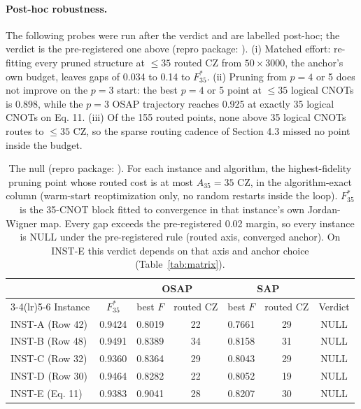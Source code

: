 \documentclass[11pt]{article}
\begin{document}
\paragraph{Post-hoc robustness.} The following probes were run after the verdict and are labelled post-hoc; the verdict is the pre-registered one above (repro package: ). (i) Matched effort: re-fitting every pruned structure at $\leq 35$ routed CZ from $50 \times 3000$, the anchor's own budget, leaves gaps of 0.034 to 0.14 to $F_{35}^{*}$. (ii) Pruning from $p = 4$ or 5 does not improve on the $p = 3$ start: the best $p = 4$ or 5 point at $\leq 35$ logical CNOTs is 0.898, while the $p = 3$ OSAP trajectory reaches 0.925 at exactly 35 logical CNOTs on Eq. 11. (iii) Of the 155 routed points, none above 35 logical CNOTs routes to $\leq 35$ CZ, so the sparse routing cadence of Section 4.3 missed no point inside the budget.

\begin{table}[t]
\centering
\begin{tabular}{lcccccc}
\toprule
 & & \multicolumn{2}{c}{OSAP} & \multicolumn{2}{c}{SAP} & \\
\cmidrule(lr){3-4}\cmidrule(lr){5-6}
Instance & $F_{35}^{*}$ & best $F$ & routed CZ & best $F$ & routed CZ & Verdict \\
\midrule
INST-A (Row 42) & 0.9424 & 0.8019 & 22 & 0.7661 & 29 & NULL \\
INST-B (Row 48) & 0.9491 & 0.8389 & 34 & 0.8158 & 31 & NULL \\
INST-C (Row 32) & 0.9360 & 0.8364 & 29 & 0.8043 & 29 & NULL \\
INST-D (Row 30) & 0.9464 & 0.8282 & 22 & 0.8052 & 19 & NULL \\
INST-E (Eq. 11) & 0.9383 & 0.9041 & 28 & 0.8207 & 30 & NULL \\
\bottomrule
\end{tabular}
\caption[]{The null (repro package: ). For each instance and algorithm, the highest-fidelity pruning point whose routed cost is at most $A_{35} = 35$ CZ, in the algorithm-exact column (warm-start reoptimization only, no random restarts inside the loop). $F_{35}^{*}$ is the 35-CNOT block fitted to convergence in that instance's own Jordan-Wigner map. Every gap exceeds the pre-registered 0.02 margin, so every instance is NULL under the pre-registered rule (routed axis, converged anchor). On INST-E this verdict depends on that axis and anchor choice (Table~\ref{tab:matrix}).}
\label{tab:null}
\end{table}
\end{document}
